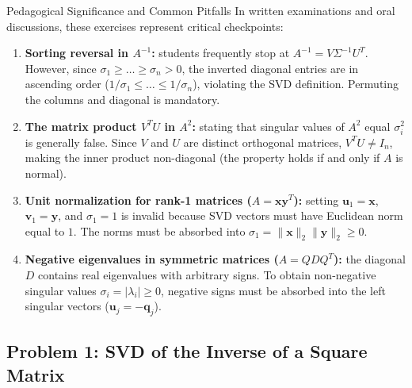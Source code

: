\begin{noteblock}{Pedagogical Significance and Common Pitfalls}
In written examinations and oral discussions, these exercises represent critical checkpoints:
\begin{enumerate}
    \item \textbf{Sorting reversal in $A^{-1}$:} students frequently stop at $A^{-1} = V \Sigma^{-1} U^T$. However, since $\sigma_1 \ge \dots \ge \sigma_n > 0$, the inverted diagonal entries are in ascending order ($1/\sigma_1 \le \dots \le 1/\sigma_n$), violating the SVD definition. Permuting the columns and diagonal is mandatory.
    \item \textbf{The matrix product $V^T U$ in $A^2$:} stating that singular values of $A^2$ equal $\sigma_i^2$ is generally false. Since $V$ and $U$ are distinct orthogonal matrices, $V^T U \neq I_n$, making the inner product non-diagonal (the property holds if and only if $A$ is normal).
    \item \textbf{Unit normalization for rank-1 matrices ($A = \mathbf{x} \mathbf{y}^T$):} setting $\mathbf{u}_1 = \mathbf{x}$, $\mathbf{v}_1 = \mathbf{y}$, and $\sigma_1 = 1$ is invalid because SVD vectors must have Euclidean norm equal to $1$. The norms must be absorbed into $\sigma_1 = \|\mathbf{x}\|_2 \|\mathbf{y}\|_2 \ge 0$.
    \item \textbf{Negative eigenvalues in symmetric matrices ($A = Q D Q^T$):} the diagonal $D$ contains real eigenvalues with arbitrary signs. To obtain non-negative singular values $\sigma_i = |\lambda_i| \ge 0$, negative signs must be absorbed into the left singular vectors ($\mathbf{u}_j = -\mathbf{q}_j$).
\end{enumerate}
\end{noteblock}

\subsection{Problem 1: SVD of the Inverse of a Square Matrix}

